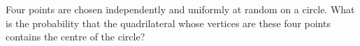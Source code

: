 Four points are chosen independently and uniformly at random on a circle. What is the probability that the quadrilateral whose vertices are these four points contains the centre of the circle?
